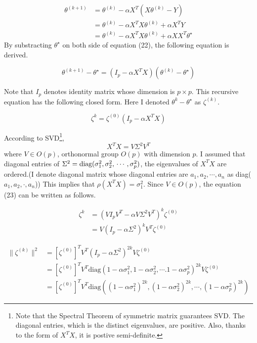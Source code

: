 \documentclass[10pt]{article}
\begin{document}
\begin{align}
    \theta^{(k+1)} &= \theta^{(k)}  - \alpha X^T(X\theta^{(k)}- Y) \\
    &= \theta^{(k)} - \alpha X^TX\theta^{(k)} + \alpha X^TY \\
    &= \theta^{(k)} - \alpha X^TX\theta^{(k)} + \alpha XX^T \theta^\star
\end{align}
By substracting $\theta^\star$ on both side of equation (22), the following equation is derived.

\begin{equation}
    \theta^{(k+1)} - \theta^\star = (I_p - \alpha X^TX)(\theta^{(k)} - \theta^\star)
\end{equation}

Note that $I_p$ denotes identity matrix whose dimension is $p \times p$. This recursive equation has the following closed form. Here I denoted $\theta^{k} - \theta^{\star}$ as $\zeta^{(k)}$.

\begin{equation}
    \zeta^{k} = \zeta^{(0)}(I_p - \alpha X^TX) 
\end{equation}

According to SVD\footnote{Note that the Spectral Theorem of symmetric matrix guarantees SVD. The diagonal entries, which is the distinct eigenvalues, are positive. Also, thanks to the form of $X^TX$, it is postive semi-definite. }, 
\begin{equation}
    X^TX = V\Sigma^2V^T
\end{equation}
where $V \in O(p)$, orthonormal group $O(p)$ with dimension $p$. I assumed that diagonal entries of $\Sigma^2 = \text{diag}(\sigma_1^2, \sigma_2^2,\\ \cdots, \sigma_p^2)$, 
the eigenvalues of $X^TX$ are ordered.(I denote diagonal matrix whose diagonal entries are $a_1,a_2,\cdots,a_n$ as diag($a_1,a_2,\cdot, a_n$))
This implies that $\rho(X^TX) = \sigma_1^2$. Since $V \in O(p)$, the equation (23) can be written as follows.

\begin{align}
    \zeta^{k} &= \left(VI_pV^T - \alpha V\Sigma^2V^T\right)^k\zeta^{(0)} \\
    &= V(I_p - \alpha \Sigma^2)^kV^T \zeta^{(0)}
\end{align}

\begin{align}
    \lVert\zeta^{(k)}\rVert^2 &= [\zeta^{(0)}]^TV^T (I_p - \alpha\Sigma^2)^{2k}V\zeta^{(0)} \\
    &= [\zeta^{(0)}]^TV^T \text{diag}(1 - \alpha \sigma_1^2, 1 - \alpha \sigma_2^2, \cdots. 1 - \alpha \sigma_p^2)^{2k} V\zeta^{(0)} \\
    &= [\zeta^{(0)}]^TV^T \text{diag}((1-\alpha \sigma_1^2)^{2k}, (1-\alpha \sigma_2^2)^{2k}, \cdots, (1-\alpha \sigma_p^2)^{2k})
\end{align}
\end{document}
